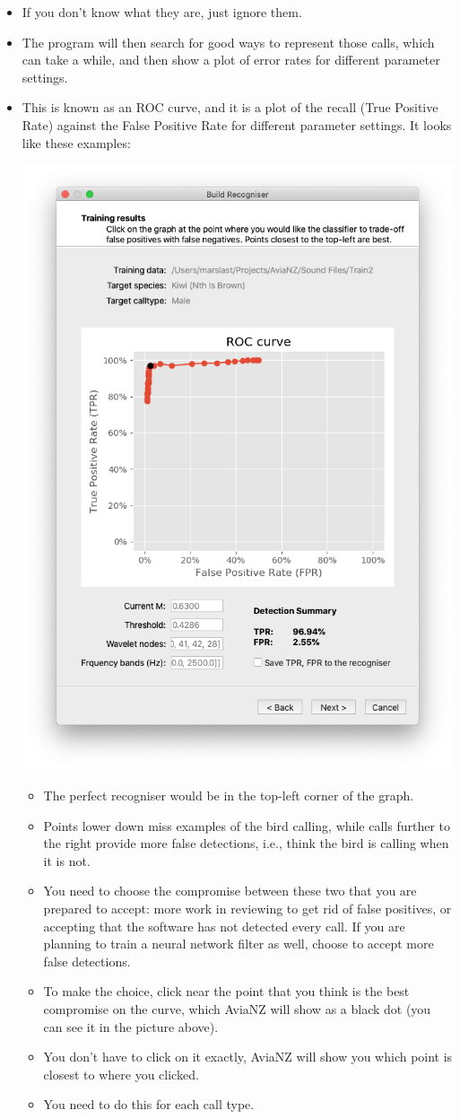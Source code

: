 \documentclass{article}
\begin{document}
\begin{itemize}
\item If you don't know what they are, just ignore them. 
\item The program will then search for good ways to represent those calls, which can take a while, and then show a plot of error rates for different parameter settings. 
\item This is known as an ROC curve, and it is a plot of the recall (True Positive Rate) against the False Positive Rate for different parameter settings. It looks like these examples:
\begin{center}
    \includegraphics[width=.4\textwidth]{Figures/BuildRecogniser4a}
\end{center}

\begin{itemize}
\item The perfect recogniser would be in the top-left corner of the graph. 
\item Points lower down miss examples of the bird calling, while calls further to the right provide more false detections, i.e., think the bird is calling when it is not. 
\item You need to choose the compromise between these two that you are prepared to accept: more work in reviewing to get rid of false positives, or accepting that the software has not detected every call. If you are planning to train a neural network filter as well, choose to accept more false detections.
\item To make the choice, click near the point that you think is the best compromise on the curve, which AviaNZ will show as a black dot (you can see it in the picture above). 
\item You don't have to click on it exactly, AviaNZ will show you which point is closest to where you clicked. 
\item You need to do this for each call type. 
\end{itemize}


\end{itemize}
\end{document}
